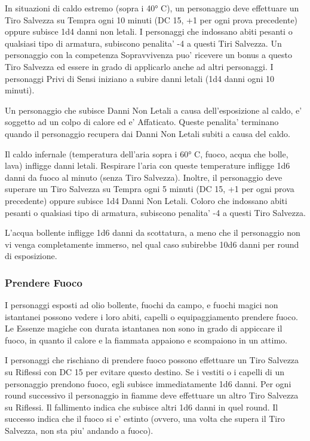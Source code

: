 \documentclass[a4paper,11pt,twoside,openany]{book}
\begin{document}
{		In situazioni di caldo estremo (sopra i 40° C), un personaggio deve effettuare un Tiro Salvezza su Tempra ogni 10 minuti (DC 15, +1 per ogni prova precedente) oppure subisce 1d4 danni non letali. I personaggi che indossano abiti pesanti o qualsiasi tipo di armatura, subiscono penalita' -4 a questi Tiri Salvezza. Un personaggio con la competenza Sopravvivenza puo' ricevere un bonus a questo Tiro Salvezza ed essere in grado di applicarlo anche ad altri personaggi. I personaggi Privi di Sensi iniziano a subire danni letali (1d4 danni ogni 10 minuti).
		
		Un personaggio che subisce Danni Non Letali a causa dell'esposizione al caldo, e' soggetto ad un colpo di calore ed e' Affaticato. Queste penalita' terminano quando il personaggio recupera dai Danni Non Letali subiti a causa del caldo.
		
		Il caldo infernale (temperatura dell'aria sopra i 60° C, fuoco, acqua che bolle, lava) infligge danni letali. Respirare l'aria con queste temperature infligge 1d6 danni da fuoco al minuto (senza Tiro Salvezza). 
		Inoltre, il personaggio deve superare un Tiro Salvezza su Tempra ogni 5 minuti (DC 15, +1 per ogni prova precedente) oppure subisce 1d4 Danni Non Letali. Coloro che indossano abiti pesanti o qualsiasi tipo di armatura, subiscono penalita' -4 a questi Tiro Salvezza.
		
		L'acqua bollente infligge 1d6 danni da scottatura, a meno che il personaggio non vi venga completamente immerso, nel qual caso subirebbe 10d6 danni per round di esposizione.
		
		\subsubsection{Prendere Fuoco}
		
		\label{prendere-fuoco}
		
		I personaggi esposti ad olio bollente, fuochi da campo, e fuochi magici non istantanei possono vedere i loro abiti, capelli o equipaggiamento prendere fuoco. Le Essenze magiche con durata istantanea non sono in grado di appiccare il fuoco, in quanto il calore e la fiammata appaiono e scompaiono in un attimo.
		
		I personaggi che rischiano di prendere fuoco possono effettuare un Tiro Salvezza su Riflessi con DC 15 per evitare questo destino. Se i vestiti o i capelli di un personaggio prendono fuoco, egli subisce immediatamente 1d6 danni. Per ogni round successivo il personaggio in fiamme deve effettuare un altro Tiro Salvezza su Riflessi. Il fallimento indica che subisce altri 1d6 danni in quel round. Il successo indica che il fuoco si e' estinto (ovvero, una volta che supera il Tiro Salvezza, non sta piu' andando a fuoco).
		
}
\end{document}
